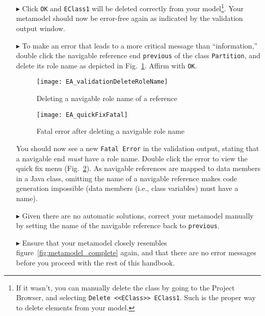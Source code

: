 \begin{enumerate}
\item[$\blacktriangleright$] Click \texttt{OK} and \texttt{EClass1} will be deleted correctly from your model\footnote{If it wasn't, you can manually delete the class by going to the Project Browser, and selecting \texttt{Delete <<EClass>> EClass1}. Such is the proper way to delete elements from your model.}.
Your metamodel should now be error-free again as indicated by the validation output window.

\item[$\blacktriangleright$] To make an error that leads to a more critical message than ``information,''
double click the navigable reference end \texttt{previous} of the class \texttt{Partition}, and delete its role name as depicted in Fig.~\ref{fig:delete-role-name}.
Affirm with \texttt{OK}.

\begin{figure}[htbp]
    \centering
  \texttt{[image: EA\_validationDeleteRoleName]}
    \caption{Deleting a navigable role name of a reference}
    \label{fig:delete-role-name}
\end{figure}


\begin{figure}[htbp]
	\centering
  \texttt{[image: EA\_quickFixFatal]}
	\caption{Fatal error after deleting a navigable role name}
	\label{fig:fatal-error}
\end{figure}

You should now see a new \texttt{Fatal Error} in the validation output, stating that a navigable end \emph{must} have a role name. Double click the error to view the quick fix menu (Fig.~\ref{fig:fatal-error}). As navigable references are mapped to data members in a Java class, omitting the name of a navigable reference makes code generation impossible (data members (i.e., class variables) must have a name).

\item[$\blacktriangleright$] Given there are no automatic solutions, correct your metamodel manually by setting the name of the navigable reference back to \texttt{previous}.

\item[$\blacktriangleright$] Ensure that your metamodel closely resembles figure~\ref{fig:metamodel_complete} again, and that there are no error messages before you proceed with the rest of this handbook.
\end{enumerate}

